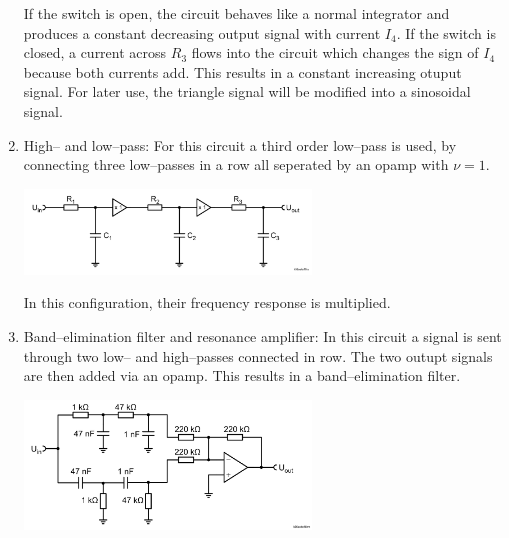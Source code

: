 \documentclass[a4paper,10pt]{article}
\newenvironment{Figure}
        {\par\medskip\noindent\minipage{\linewidth}}
        {\endminipage\par\medskip} %
\numberwithin{equation}{section}
\begin{document}
\begin{multicols}{2}
\begin{enumerate}[label=\arabic*]
\begin{Figure}
                        \end{Figure}
                        If the switch is open, the circuit behaves like a normal integrator and produces a constant decreasing output signal with current $I_4$.
                        If the switch is closed, a current across $R_3$ flows into the circuit which changes the sign of $I_4$ because both currents add.
                        This results in a constant increasing otuput signal.
                        For later use, the triangle signal will be modified into a sinosoidal signal.
                \item High-- and low--pass: 
                        For this circuit a third order low--pass is used, by connecting three low--passes in a row all seperated by an opamp with $\nu =1$.
                        \begin{Figure}
                                \centering
                                \includegraphics[width=0.6\textwidth]{lowpass_third_order.png}
                        \end{Figure}
                        In this configuration, their frequency response is multiplied.
                \item Band--elimination filter and resonance amplifier:
                        In this circuit a signal is sent through two low-- and high--passes connected in row.
                        The two outupt signals are then added via an opamp.
                        This results in a band--elimination filter.
                        \begin{Figure}
                                \centering
                                \includegraphics[width=0.6\textwidth]{band_elimination_filter.png}

\end{Figure}
\end{enumerate}
\end{multicols}
\end{document}

